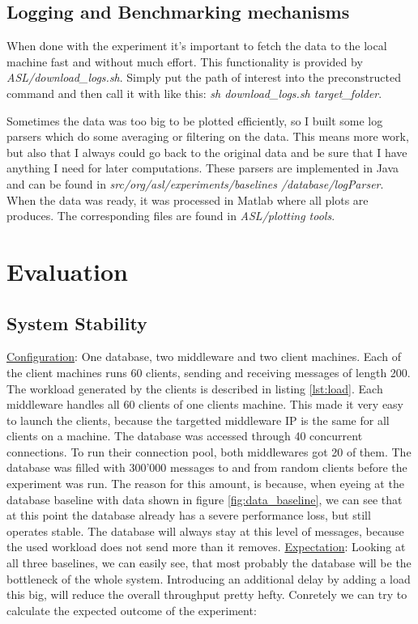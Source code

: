 \documentclass[11pt]{article}
\begin{document}
\subsection{Logging and Benchmarking mechanisms}\label{sec:logging-and-benchmarking-mechanisms}
When done with the experiment it's important to fetch the data to the local machine fast and without much effort. This functionality is provided by \textit{ASL/download\_logs.sh}. Simply put the path of interest into the preconstructed command and then call it with like this: \textit{sh download\_logs.sh target\_folder}.

Sometimes the data was too big to be plotted efficiently, so I built some log parsers which do some averaging or filtering on the data. This means more work, but also that I always could go back to the original data and be sure that I have anything I need for later computations. These parsers are implemented in Java and can be found in \textit{src/org/asl/experiments/baselines /database/logParser}. When the data was ready, it was processed in Matlab where all plots are produces. The corresponding files are found in \textit{ASL/plotting tools}.

\section{Evaluation}\label{sec:evaluation}

\subsection{System Stability}\label{sec:system-stability}

\underline{Configuration}: One database, two middleware and two client machines. Each of the client machines runs 60 clients, sending and receiving messages of length 200. The workload generated by the clients is described in listing \ref{lst:load}. Each middleware handles all 60 clients of one clients machine. This made it very easy to launch the clients, because the targetted middleware IP is the same for all clients on a machine. The database was accessed through 40 concurrent connections. To run their connection pool, both middlewares got 20 of them. The database was filled with 300'000 messages to and from random clients before the experiment was run. The reason for this amount, is because, when eyeing at the database baseline with data shown in figure \ref{fig:data_baseline}, we can see that at this point the database already has a severe performance loss, but still operates stable. The database will always stay at this level of messages, because the used workload does not send more than it removes.
\newline\underline{Expectation}: Looking at all three baselines, we can easily see, that most probably the database will be the bottleneck of the whole system. Introducing an additional delay by adding a load this big, will reduce the overall throughput pretty hefty. Conretely we can try to calculate the expected outcome of the experiment:
\end{document}

